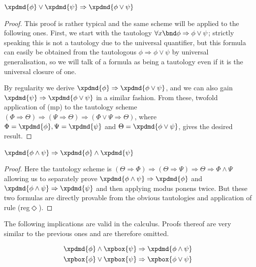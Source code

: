 \begin{lem}
  $\xpdmd{\phi} \lor \xpdmd{\psi} \Rightarrow \xpdmd{\phi \lor \psi}$
\end{lem}
\begin{proof}
  This proof is rather typical and the same scheme will be applied to the
  following ones. First, we start with the tautology $\forall x\bnd \phi \Rightarrow \phi \lor \psi$;
  strictly speaking this is not a tautology due to the universal quantifier, but
  this formula can easily be obtained from the tautologous $\phi \Rightarrow \phi \lor \psi$ by
  universal generalisation, so we will talk of a formula as being a tautology
  even if it is the universal closure of one.

  By regularity we derive $\xpdmd{\phi} \Rightarrow \xpdmd{\phi \lor \psi}$, and we can also gain
  $\xpdmd{\psi} \Rightarrow \xpdmd{\phi \lor \psi}$ in a similar fashion. From these, twofold
  application of (mp) to the tautology scheme $(\Phi \Rightarrow \Theta) \Rightarrow (\Psi \Rightarrow \Theta) \Rightarrow (\Phi \lor \Psi \Rightarrow \Theta)$,
  where $\Phi = \xpdmd{\phi}, \Psi = \xpdmd{\psi}$ and $\Theta = \xpdmd{\phi \lor \psi}$, gives the
  desired result.
\end{proof}

\begin{lem}
  $\xpdmd{\phi \land \psi} \Rightarrow \xpdmd{\phi} \land \xpdmd{\psi}$
\end{lem}
\begin{proof}
  Here the tautology scheme is $(\Theta \Rightarrow \Phi) \Rightarrow (\Theta \Rightarrow \Psi) \Rightarrow \Theta  \Rightarrow \Phi  \land \Psi $ allowing us to
  separately prove $\xpdmd{\phi\land\psi} \Rightarrow \xpdmd{\phi}$ and $\xpdmd{\phi\land\psi} \Rightarrow \xpdmd{\psi}$ and
  then applying modus ponens twice. But these two formulas are directly provable
  from the obvious tautologies and application of rule (reg$\Diamond$).
\end{proof}

\begin{lem}
  \label{thm:more-distrib}
  The following implications are valid in the calculus. Proofs thereof are very
  similar to the previous ones and are therefore omitted.

  \begin{equation}
    \begin{split}
      \nonumber
      \xpdmd{\phi} \land \xpbox{\psi} \Rightarrow \xpdmd{\phi \land \psi} \\
      \xpbox{\phi} \lor \xpbox{\psi} \Rightarrow \xpbox{\phi \lor \psi} \label{eq:box-or-distrib}
    \end{split}
  \end{equation}
\end{lem}

